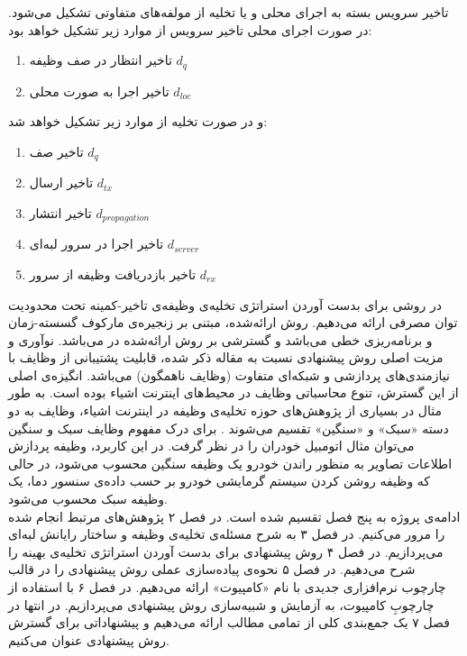 تاخیر سرویس بسته به اجرای محلی و یا تخلیه از مولفه‌های متفاوتی تشکیل می‌شود. در صورت اجرای محلی تاخیر سرویس از موارد زیر تشکیل خواهد بود:
\begin{enumerate}
	\item تاخیر انتظار در صف وظیفه $d_q$
	\item تاخیر اجرا به صورت محلی $d_{l o c}$
\end{enumerate}
و در صورت تخلیه از موارد زیر تشکیل خواهد شد:
\begin{enumerate}
	\item تاخیر صف $d_q$
	\item تاخیر ارسال $d_{t x}$
	\item تاخیر انتشار $d_{p r o p a g a t i o n}$
	\item تاخیر اجرا در سرور لبه‌ای $d_{s e r v e r}$
	\item تاخیر بازدریافت وظیفه از سرور $d_{r x}$
\end{enumerate}
در \CurrentProject روشی برای بدست آوردن استراتژی تخلیه‌ی وظیفه‌ی تاخیر-کمینه تحت محدودیت توان مصرفی ارائه می‌دهیم. روش ارائه‌شده، مبتنی بر زنجیره‌ی مارکوف گسسته-زمان و برنامه‌ریزی خطی می‌باشد و گسترشی بر روش ارائه‌شده در \Cite{Liu} می‌باشد. نوآوری و مزیت اصلی روش پیشنهادی نسبت به مقاله ذکر شده،‌ قابلیت پشتیبانی از وظایف با نیازمندی‌های پردازشی و شبکه‌ای متفاوت (وظایف ناهمگون) می‌باشد. انگیزه‌ی اصلی از این گسترش، تنوع محاسباتی وظایف در محیط‌های اینترنت اشیاء بوده است. به طور مثال در بسیاری از پژوهش‌های حوزه تخلیه‌ی وظیفه در اینترنت اشیاء، وظایف به دو دسته «سبک» و «سنگین» تقسیم می‌شوند \Cite{yousefpour, tran}. برای درک مفهوم وظایف سبک و سنگین می‌توان مثال اتومبیل خودران را در نظر گرفت. در این کاربرد، وظیفه پردازش اطلاعات تصاویر به منظور راندن خودرو یک وظیفه سنگین محسوب می‌شود، در حالی که وظیفه‌ روشن کردن سیستم گرمایشی خودرو بر حسب داده‌ی سنسور دما، یک وظیفه سبک محسوب می‌شود. \\

ادامه‌ی پروژه به پنج فصل تقسیم شده است. در فصل ۲ پژوهش‌های مرتبط انجام شده را مرور می‌کنیم. در فصل ۳ به شرح مسئله‌ی تخلیه‌ی وظیفه و ساختار رایانش لبه‌ای می‌پردازیم. در فصل ۴ روش پیشنهادی برای بدست آوردن استراتژی تخلیه‌ی بهینه را شرح می‌دهیم. در فصل ۵ نحوه‌ی پیاده‌سازی عملی روش پیشنهادی را در قالب چارچوب نرم‌افزاری جدیدی با نام «کامپیوت» ارائه می‌دهیم. در فصل ۶ با استفاده از چارچوبِ کامپیوت، به آزمایش و شبیه‌سازی روش پیشنهادی می‌پردازیم. در انتها در فصل ۷ یک جمع‌بندی کلی از تمامی مطالب ارائه می‌دهیم و پیشنهاداتی برای گسترش روش پیشنهادی عنوان می‌کنیم.
\clearpage
